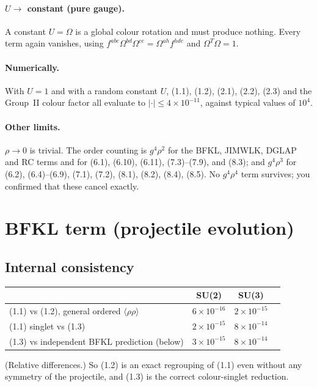 \documentclass[10pt]{article}
\begin{document}
\paragraph{$U\to$ constant (pure gauge).} A constant $U=\Omega$ is a global colour rotation and must produce nothing. Every term again
vanishes, using $f^{abc}\Omega^{bd}\Omega^{ce}=\Omega^{ah}f^{hde}$ and $\Omega^T\Omega=1$.
\paragraph{Numerically.} With $U=1$ and with a random constant $U$, (1.1), (1.2), (2.1), (2.2), (2.3) and the Group~II colour factor all evaluate to $|{\cdot}|\le4\times10^{-11}$, against typical values of $10^4$.
\paragraph{Other limits.} $\rho\to0$ is trivial. The order counting is $g^4\rho^2$ for the BFKL, JIMWLK, DGLAP and RC terms and for (6.1), (6.10), (6.11),
(7.3)--(7.9), and (8.3); and $g^4\rho^3$ for (6.2), (6.4)--(6.9), (7.1), (7.2), (8.1), (8.2), (8.4), (8.5). No $g^4\rho^4$ term survives; you confirmed that these cancel exactly.

\section{BFKL term (projectile evolution)}\label{sec:bfkl}
\subsection{Internal consistency}
\begin{center}
\begin{tabular}{lccc}
\toprule
 & SU(2) & SU(3) \\
\midrule
(1.1) vs (1.2), general ordered $\langle\rho\rho\rangle$ & $6\times10^{-16}$ & $2\times10^{-15}$ \\
(1.1) singlet vs (1.3) & $2\times10^{-15}$ & $8\times10^{-14}$ \\
(1.3) vs independent BFKL prediction (below) & $3\times10^{-15}$ & $8\times10^{-14}$ \\
\bottomrule
\end{tabular}
\end{center}
(Relative differences.) So (1.2) is an exact regrouping of (1.1) even without any symmetry of the projectile, and (1.3) is the correct
colour-singlet reduction.
\end{document}
